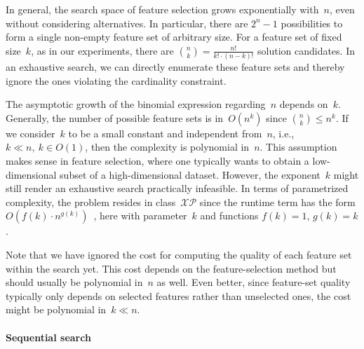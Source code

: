 \documentclass{article}
\theoremstyle{definition}
\begin{document}
In general, the search space of feature selection grows exponentially with~$n$, even without considering alternatives.
In particular, there are $2^n - 1$ possibilities to form a single non-empty feature set of arbitrary size.
For a feature set of fixed size~$k$, as in our experiments, there are $\binom{n}{k} = \frac{n!}{k! \cdot (n-k)!}$ solution candidates.
In an exhaustive search, we can directly enumerate these feature sets and thereby ignore the ones violating the cardinality constraint.

The asymptotic growth of the binomial expression regarding~$n$ depends on~$k$.
Generally, the number of possible feature sets is in~$O(n^k)$ since $\binom{n}{k} \leq n^k$.
If we consider~$k$ to be a small constant and independent from~$n$, i.e., $k \ll n,~k \in O(1)$, then the complexity is polynomial in~$n$.
This assumption makes sense in feature selection, where one typically wants to obtain a low-dimensional subset of a high-dimensional dataset.
However, the exponent~$k$ might still render an exhaustive search practically infeasible.
In terms of parametrized complexity, the problem resides in class~$\mathcal{XP}$ since the runtime term has the form $O(f(k) \cdot n^{g(k)})$~\cite{downey1997parameterized}, here with parameter~$k$ and functions $f(k) = 1$, $g(k) = k$.

Note that we have ignored the cost for computing the quality of each feature set within the search yet.
This cost depends on the feature-selection method but should usually be polynomial in~$n$ as well.
Even better, since feature-set quality typically only depends on selected features rather than unselected ones, the cost might be polynomial in~$k \ll n$.

\paragraph{Sequential search}
\end{document}
